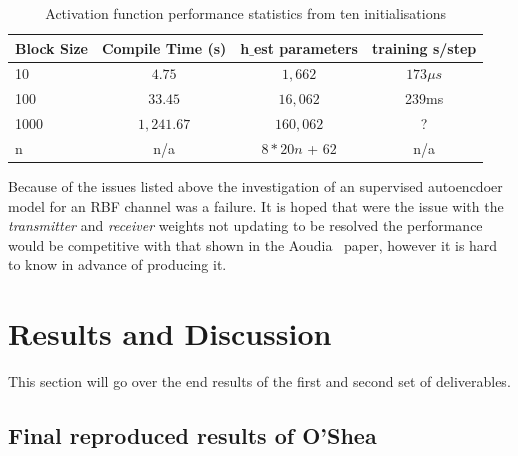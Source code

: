 \documentclass[12pt,onecolumn,letterpaper]{article}
\newcommand{\code}{\textit}
\begin{document}
\begin{table}[H]
   \begin{center}
   \begin{tabular}{|l|c|c|c|}
   \hline
   Block Size & Compile Time (s) & h$\_$est parameters & training s/step\\
   \hline\hline
   10 & $4.75$ & $1,662$ & $173\mu s$ \\
   100 & $33.45$ & $16,062$ & 239ms \\
   1000 & $1,241.67$ & $160,062$ & ? \\
   n & n/a& $8*20n$ + $62$ & n/a \\
   \hline
   \end{tabular}
   \end{center}
   \caption{Activation function performance statistics from ten initialisations}
   \label{tab:RbfBlockSizeChars}
\end{table}

Because of the issues listed above the investigation of an supervised autoencdoer model for an RBF channel was a failure. It is hoped that were the issue with the \code{transmitter} and \code{receiver} weights not updating to be resolved the performance would be competitive with that shown in the Aoudia~\cite{Aoudia} paper, however it is hard to know in advance of producing it. 

\FloatBarrier
\section{Results and Discussion}

This section will go over the end results of the first and second set of deliverables. 

\subsection{Final reproduced results of O'Shea \etal}
\end{document}

